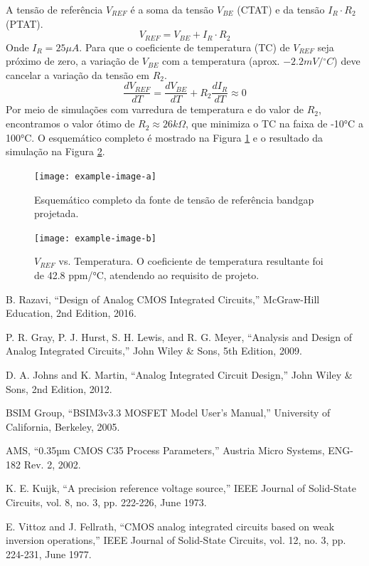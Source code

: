 ﻿\documentclass[12pt,a4paper]{article}
\newcommand{\degree}{\ensuremath{{}^\circ}}
\begin{document}
A tensão de referência $V_{REF}$ é a soma da tensão $V_{BE}$ (CTAT) e da tensão $I_R \cdot R_2$ (PTAT).
\begin{equation}
V_{REF} = V_{BE} + I_R \cdot R_2
\end{equation}
Onde $I_R = 25\mu A$. Para que o coeficiente de temperatura (TC) de $V_{REF}$ seja próximo de zero, a variação de $V_{BE}$ com a temperatura (aprox. $-2.2mV/\degree C$) deve cancelar a variação da tensão em $R_2$.
\begin{equation}
\frac{dV_{REF}}{dT} = \frac{dV_{BE}}{dT} + R_2 \frac{dI_R}{dT} \approx 0
\end{equation}
Por meio de simulações com varredura de temperatura e do valor de $R_2$, encontramos o valor ótimo de $R_2 \approx 26k\Omega$, que minimiza o TC na faixa de -10°C a 100°C. O esquemático completo é mostrado na Figura \ref{fig:bandgap_complete_schematic} e o resultado da simulação na Figura \ref{fig:vref_vs_temp}.

\begin{figure}[H]
\centering
\texttt{[image: example-image-a]}
\caption{Esquemático completo da fonte de tensão de referência bandgap projetada.}
\label{fig:bandgap_complete_schematic}
\end{figure}

\begin{figure}[H]
\centering
\texttt{[image: example-image-b]}
\caption{$V_{REF}$ vs. Temperatura. O coeficiente de temperatura resultante foi de 42.8 ppm/°C, atendendo ao requisito de projeto.}
\label{fig:vref_vs_temp}
\end{figure}

{}
\begin{thebibliography}{99}
     B. Razavi, ``Design of Analog CMOS Integrated Circuits,'' McGraw-Hill Education, 2nd Edition, 2016.
    
     P. R. Gray, P. J. Hurst, S. H. Lewis, and R. G. Meyer, ``Analysis and Design of Analog Integrated Circuits,'' John Wiley \& Sons, 5th Edition, 2009.
    
     D. A. Johns and K. Martin, ``Analog Integrated Circuit Design,'' John Wiley \& Sons, 2nd Edition, 2012.
    
     BSIM Group, ``BSIM3v3.3 MOSFET Model User's Manual,'' University of California, Berkeley, 2005.
    
     AMS, ``0.35µm CMOS C35 Process Parameters,'' Austria Micro Systems, ENG-182 Rev. 2, 2002.
    
     K. E. Kuijk, ``A precision reference voltage source,'' IEEE Journal of Solid-State Circuits, vol. 8, no. 3, pp. 222-226, June 1973.
    
     E. Vittoz and J. Fellrath, ``CMOS analog integrated circuits based on weak inversion operations,'' IEEE Journal of Solid-State Circuits, vol. 12, no. 3, pp. 224-231, June 1977.
\end{thebibliography}
\end{document}
